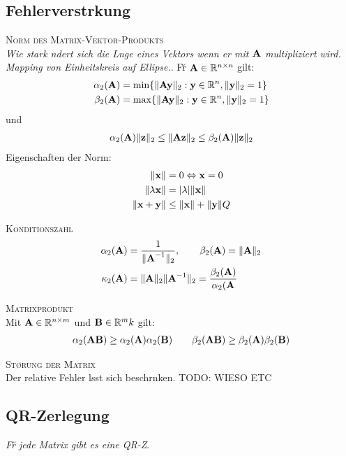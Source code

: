\subsection{Fehlerverst\a rkung}
\textsc{Norm des Matrix-Vektor-Produkts}\\
\emph{Wie stark \a ndert sich die L\a nge eines Vektors wenn er mit $\mbox{\bf A}$ multipliziert wird. Mapping von Einheitskreis auf Ellipse.}.
F\u r $\mbox{\bf A} \in \mathbb{R}^{n \times n}$ gilt:
\begin{align*}
\alpha_2(\mbox{\bf A}) &= \min\{\Vert \mbox{\bf Ay} \Vert_2 : \mbox{\bf y}\in\mathbb{R}^{n}, \Vert \mbox{\bf y} \Vert_2 =1 \} \\
\beta_2(\mbox{\bf A}) &= \max\{\Vert \mbox{\bf Ay} \Vert_2 : \mbox{\bf y}\in\mathbb{R}^{n}, \Vert \mbox{\bf y} \Vert_2 =1 \} 
\end{align*}
und
\begin{align*}
\alpha_2(\mbox{\bf A})\Vert \mbox{\bf z} \Vert_2 \leq \Vert \mbox{\bf Az} \Vert_2 \leq \beta_2(\mbox{\bf A})\Vert \mbox{\bf z} \Vert_2
\end{align*}
Eigenschaften der Norm:
\begin{align*}
\Vert \mbox{\bf x} \Vert &= 0 \Leftrightarrow \mbox{\bf x} = 0 \\
\Vert \lambda \mbox{\bf x} \Vert &= | \lambda | \Vert \mbox{\bf x} \Vert \\
\Vert \mbox{\bf x} + \mbox{\bf y} \Vert &\leq \Vert \mbox{\bf x} \Vert+\Vert \mbox{\bf y} \Vert
Q\end{align*}

\textsc{Konditionszahl}
\begin{align*}
\alpha_2(\mbox{\bf A})&=\frac{1}{\Vert \mbox{\bf A}^{-1} \Vert_2}, \qquad \beta_2(\mbox{\bf A})=\Vert \mbox{\bf A}\Vert_2 \\
\kappa_2(\mbox{\bf A}) &= \Vert \mbox{\bf A} \Vert_2 \Vert \mbox{\bf A}^{-1} \Vert_2 = \frac{\beta_2(\mbox{\bf A})}{\alpha_2(\mbox{\bf A}}
\end{align*}

\textsc{Matrixprodukt}\\
Mit $\mbox{\bf A} \in \mathbb{R}^{n \times m}$ und $\mbox{\bf B} \in \mathbb{R}^{m}{k}$ gilt:
\begin{align*}
\alpha_2(\mbox{\bf AB}) \geq \alpha_2(\mbox{\bf A})\alpha_2(\mbox{\bf B}) \qquad \beta_2(\mbox{\bf AB}) \geq \beta_2(\mbox{\bf A})\beta_2(\mbox{\bf B})
\end{align*}

\textsc{St\o rung der Matrix}\\
Der relative Fehler l\a sst sich beschr\a nken. TODO: WIESO ETC

\subsection{QR-Zerlegung}
\emph{F\u r jede Matrix gibt es eine QR-Z}.\\


